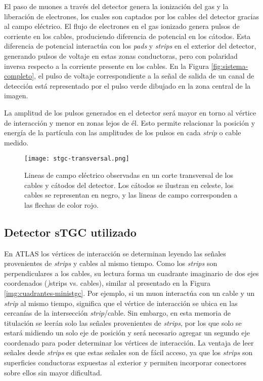 	El paso de muones a través del detector genera la ionización del gas y la liberación de electrones, los cuales son captados por los cables del detector gracias al campo eléctrico. El flujo de electrones en el gas ionizado genera pulsos de corriente en los cables, produciendo diferencia de potencial en los cátodos. Esta diferencia de potencial interactúa con los \textit{pads} y \textit{strips} en el exterior del detector, generando pulsos de voltaje en estas zonas conductoras, pero con polaridad inversa respecto a la corriente presente en los cables. En la Figura \ref{fig:sistema-completo}, el pulso de voltaje correspondiente a la señal de salida de un canal de detección está representado por el pulso verde dibujado en la zona central de la imagen.
	
	La amplitud de los pulsos generados en el detector será mayor en torno al vértice de interacción y menor en zonas lejos de él. Esto permite relacionar la posición y energía de la partícula con las amplitudes de los pulsos en cada \textit{strip} o cable medido.
	
	\begin{figure}[h]
		\centering
		\texttt{[image: stgc-transversal.png]}
		\caption{Lineas de campo eléctrico observadas en un corte transversal de los cables y cátodos del detector. Los cátodos se ilustran en celeste, los cables se representan en negro, y las lineas de campo corresponden a las flechas de color rojo\cite{DeSmet2011StudyLab}.}
		\label{img:stgc-field}
	\end{figure}

\subsection{Detector sTGC utilizado}
	En ATLAS los vértices de interacción se determinan leyendo las señales provenientes de \textit{strips} y cables al mismo tiempo. Como los \textit{strips} son perpendiculares a los cables, su lectura forma un cuadrante imaginario de dos ejes coordenados (\textit){strips} vs. cables), similar al presentado en la Figura \ref{img:cuadrantes-ministgc}. Por ejemplo,    si un muon interactúa con un cable y un \textit{strip} al mismo tiempo, significa que el vértice de interacción se ubica en las cercanías de la intersección \textit{strip}/cable. Sin embargo, en esta memoria de titulación se leerán solo las señales provenientes de \textit{strips}, por los que solo se estará midiendo un solo eje de posición y será necesario agregar un segundo eje coordenado para poder determinar los vértices de interacción. La ventaja de leer señales desde \textit{strips} es que estas señales son de fácil acceso, ya que los \textit{strips} son superficies conductoras expuestas al exterior y permiten incorporar conectores sobre ellos sin mayor dificultad.
	
